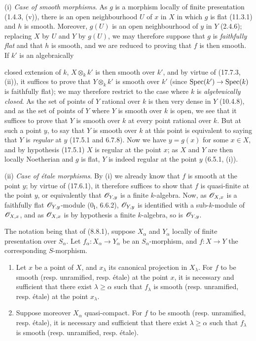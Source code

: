 (i) \emph{Case of smooth morphisms}. As $g$ is a morphism locally of finite presentation (1.4.3, (v)), there is an open neighbourhood $U$ of $x$ in $X$ in which $g$ is flat (11.3.1) and $h$ is smooth. Moreover, $g(U)$ is an open neighbourhood of $y$ in $Y$ (2.4.6); replacing $X$ by $U$ and $Y$ by $g(U)$, we may therefore suppose that $g$ is \emph{faithfully flat} and that $h$ is smooth, and we are reduced to proving that $f$ is then smooth. If $k'$ is an algebraically


closed extension of $k$, $X\otimes_k k'$ is then smooth over $k'$, and by virtue of (17.7.3, (ii)), it suffices to prove that $Y\otimes_k k'$ is smooth over $k'$ (since $\operatorname{Spec}(k')\to\operatorname{Spec}(k)$ is faithfully flat); we may therefore restrict to the case where $k$ is \emph{algebraically closed}. As the set of points of $Y$ rational over $k$ is then very dense in $Y$ (10.4.8), and as the set of points of $Y$ where $Y$ is smooth over $k$ is open, we see that it suffices to prove that $Y$ is smooth over $k$ at every point rational over $k$. But at such a point $y$, to say that $Y$ is smooth over $k$ at this point is equivalent to saying that $Y$ is \emph{regular} at $y$ (17.5.1 and 6.7.8). Now we have $y=g(x)$ for some $x\in X$, and by hypothesis (17.5.1) $X$ is regular at the point $x$; as $X$ and $Y$ are then locally Noetherian and $g$ is flat, $Y$ is indeed regular at the point $y$ (6.5.1, (i)).

(ii) \emph{Case of étale morphisms}. By (i) we already know that $f$ is smooth at the point $y$; by virtue of (17.6.1), it therefore suffices to show that $f$ is quasi-finite at the point $y$, or equivalently that $\mathscr{O}_{Y,y}$ is a finite $k$-algebra. Now, as $\mathscr{O}_{X,x}$ is a faithfully flat $\mathscr{O}_{Y,y}$-module ($0_{\mathrm I}$, 6.6.2), $\mathscr{O}_{Y,y}$ is identified with a sub-$k$-module of $\mathscr{O}_{X,x}$, and as $\mathscr{O}_{X,x}$ is by hypothesis a finite $k$-algebra, so is $\mathscr{O}_{Y,y}$.

\begin{proposition}[17.7.8]
\label{IV.17.7.8}
The notation being that of (8.8.1), suppose $X_\alpha$ and $Y_\alpha$ locally of finite presentation over $S_\alpha$. Let $f_\alpha:X_\alpha\to Y_\alpha$ be an $S_\alpha$-morphism, and $f:X\to Y$ the corresponding $S$-morphism.
\begin{enumerate}
  \item[(i)] Let $x$ be a point of $X$, and $x_\lambda$ its canonical projection in $X_\lambda$. For $f$ to be smooth (resp. unramified, resp. étale) at the point $x$, it is necessary and sufficient that there exist $\lambda\geq\alpha$ such that $f_\lambda$ is smooth (resp. unramified, resp. étale) at the point $x_\lambda$.
  \item[(ii)] Suppose moreover $X_\alpha$ quasi-compact. For $f$ to be smooth (resp. unramified, resp. étale), it is necessary and sufficient that there exist $\lambda\geq\alpha$ such that $f_\lambda$ is smooth (resp. unramified, resp. étale).
\end{enumerate}
\end{proposition}


